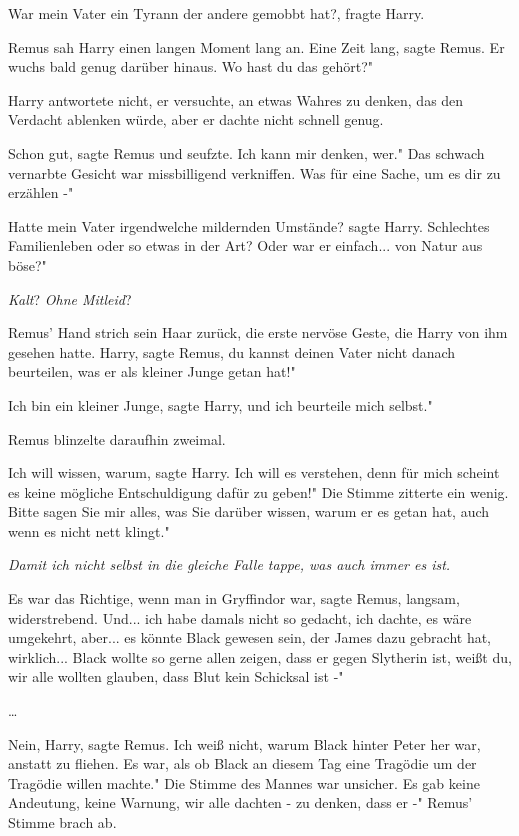 \glqq{}War mein Vater ein Tyrann der andere gemobbt hat?\grqq{}, fragte Harry.

Remus sah Harry einen langen Moment lang an. \glqq{}Eine Zeit lang\grqq{}, sagte
Remus. \glqq{}Er wuchs bald genug darüber hinaus. Wo hast du das gehört?"

Harry antwortete nicht, er versuchte, an etwas Wahres zu denken, das den
Verdacht ablenken würde, aber er dachte nicht schnell genug.

\glqq{}Schon gut\grqq{}, sagte Remus und seufzte. \glqq{}Ich kann mir denken,
wer." Das schwach vernarbte Gesicht war missbilligend verkniffen. \glqq{}Was für
eine Sache, um es dir zu erzählen -"

\glqq{}Hatte mein Vater irgendwelche mildernden Umstände?\grqq{} sagte Harry.
\glqq{}Schlechtes Familienleben oder so etwas in der Art? Oder war er einfach...
von Natur aus böse?"

\emph{Kalt}? \emph{Ohne Mitleid}?

Remus' Hand strich sein Haar zurück, die erste nervöse Geste, die Harry von ihm
gesehen hatte. \glqq{}Harry\grqq{}, sagte Remus, \glqq{}du kannst deinen Vater
nicht danach beurteilen, was er als kleiner Junge getan hat!"

\glqq{}Ich bin ein kleiner Junge\grqq{}, sagte Harry, \glqq{}und ich beurteile
mich selbst."

Remus blinzelte daraufhin zweimal.

\glqq{}Ich will wissen, warum\grqq{}, sagte Harry. \glqq{}Ich will es verstehen,
denn für mich scheint es keine mögliche Entschuldigung dafür zu geben!" Die
Stimme zitterte ein wenig. \glqq{}Bitte sagen Sie mir alles, was Sie darüber
wissen, warum er es getan hat, auch wenn es nicht nett klingt."

\emph{Damit ich nicht selbst in die gleiche Falle tappe, was auch immer es ist.}

\glqq{}Es war das Richtige, wenn man in Gryffindor war\grqq{}, sagte Remus,
langsam, widerstrebend. \glqq{}Und... ich habe damals nicht so gedacht, ich
dachte, es wäre umgekehrt, aber... es könnte Black gewesen sein, der James dazu
gebracht hat, wirklich... Black wollte so gerne allen zeigen, dass er gegen
Slytherin ist, weißt du, wir alle wollten glauben, dass Blut kein Schicksal ist
-"

…

\glqq{}Nein, Harry\grqq{}, sagte Remus. \glqq{}Ich weiß nicht, warum Black hinter
Peter her war, anstatt zu fliehen. Es war, als ob Black an diesem Tag eine
Tragödie um der Tragödie willen machte." Die Stimme des Mannes war unsicher.
\glqq{}Es gab keine Andeutung, keine Warnung, wir alle dachten - zu denken, dass
er -" Remus' Stimme brach ab.

